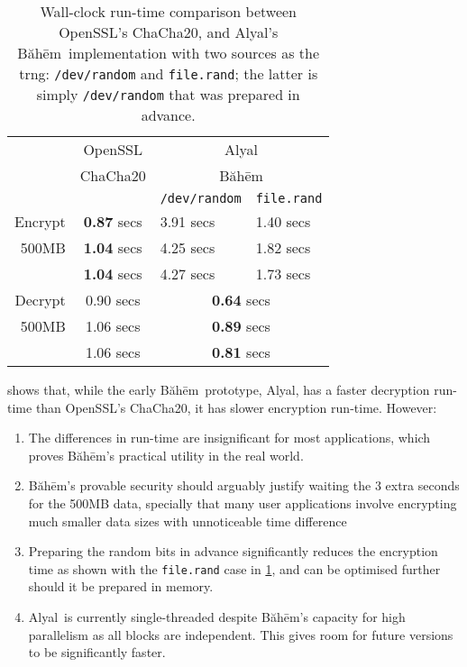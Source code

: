 \documentclass[twocolumn,hidelinks]{article}
\newcommand{\baheem}{Băhēm}
\newcommand{\alyal}{Alyal}
\begin{document}
\begin{table}[tbh]
    \centering
    \begin{tabular}{rcll}
                & OpenSSL            & \multicolumn{2}{c}{\alyal}                \\
                & ChaCha20           & \multicolumn{2}{c}{\baheem}               \\
                &                    & \texttt{/dev/random} & \texttt{file.rand} \\\hline
        Encrypt & \textbf{0.87} secs & 3.91 secs            & 1.40 secs          \\
        500MB   & \textbf{1.04} secs & 4.25 secs            & 1.82 secs          \\
                & \textbf{1.04} secs & 4.27 secs            & 1.73 secs          \\\hline
        Decrypt & 0.90 secs          & \multicolumn{2}{c}{\textbf{0.64} secs}    \\
        500MB   & 1.06 secs          & \multicolumn{2}{c}{\textbf{0.89} secs}    \\
                & 1.06 secs          & \multicolumn{2}{c}{\textbf{0.81} secs}    \\
    \end{tabular}
    \caption{Wall-clock run-time comparison between OpenSSL's ChaCha20, and
    \alyal's \baheem\ implementation with two sources as the \gls{trng}:
    \texttt{/dev/random} and \texttt{file.rand};  the latter is simply
    \texttt{/dev/random} that was prepared in advance.}
    \label{tbl_benchmark}
\end{table}

 shows that, while the early \baheem\ prototype,
\alyal, has a faster decryption run-time than OpenSSL's ChaCha20, it has
slower encryption run-time. However:
\begin{enumerate}
    \item The differences in run-time are insignificant for most
        applications, which proves \baheem's practical utility in the real
        world.
    \item \baheem's provable security should arguably justify waiting the
        $3$ extra seconds for the 500MB data, specially that many user
        applications involve encrypting much smaller data sizes with
        unnoticeable time difference
    \item Preparing the random bits in advance significantly reduces the
        encryption time as shown with the \texttt{file.rand} case in
        \cref{tbl_benchmark}, and can be optimised further should it be
        prepared in memory.
    \item \alyal\ is currently single-threaded despite \baheem's capacity
        for high parallelism as all blocks are independent. This gives room
        for future versions to be significantly faster.
\end{enumerate}
\end{document}
